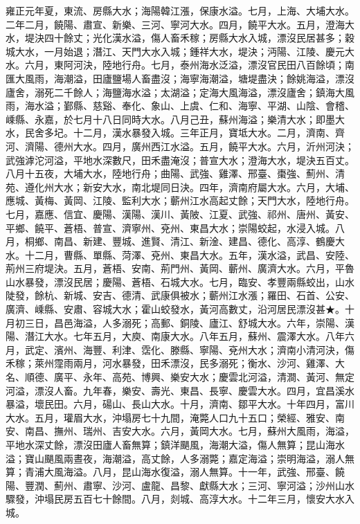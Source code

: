 \begin{pinyinscope}
雍正元年夏，東流、房縣大水；海陽韓江漲，保康水溢。七月，上海、大埔大水。二年二月，饒陽、肅宣、新樂、三河、寧河大水。四月，饒平大水。五月，澄海大水，堤決四十餘丈；光化漢水溢，傷人畜禾稼；房縣大水入城，漂沒民居甚多；穀城大水，一月始退；潛江、天門大水入城；鍾祥大水，堤決；沔陽、江陵、慶元大水。六月，東阿河決，陸地行舟。七月，泰州海水泛溢，漂沒官民田八百餘頃；南匯大風雨，海潮溢，田廬鹽場人畜盡沒；海寧海潮溢，塘堤盡決；餘姚海溢，漂沒廬舍，溺死二千餘人；海鹽海水溢；太湖溢；定海大風海溢，漂沒廬舍；鎮海大風雨，海水溢；鄞縣、慈谿、奉化、象山、上虞、仁和、海寧、平湖、山陰、會稽、嵊縣、永嘉，於七月十八日同時大水。八月己丑，蘇州海溢；樂清大水；即墨大水，民舍多圮。十二月，漢水暴發入城。三年正月，寶坻大水。二月，濟南、齊河、濟陽、德州大水。四月，廣州西江水溢。五月，饒平大水。六月，沂州河決；武強滹沱河溢，平地水深數尺，田禾盡淹沒；普宣大水；澄海大水，堤決五百丈。八月十五夜，大埔大水，陸地行舟；曲陽、武強、雞澤、邢臺、棗強、薊州、清苑、遵化州大水；新安大水，南北堤同日決。四年，濟南府屬大水。六月，大埔、應城、黃梅、黃岡、江陵、監利大水；蘄州江水高起丈餘；天門大水，陸地行舟。七月，嘉應、信宜、慶陽、漢陽、漢川、黃陂、江夏、武強、祁州、唐州、黃安、平鄉、饒平、蒼梧、普宣、濟寧州、兗州、東昌大水；崇陽蛟起，水浸入城。八月，桐鄉、南昌、新建、豐城、進賢、清江、新淦、建昌、德化、高淳、鶴慶大水。十二月，曹縣、單縣、菏澤、兗州、東昌大水。五年，漢水溢，武昌、安陸、荊州三府堤決。五月，蒼梧、安南、荊門州、黃岡、蘄州、廣濟大水。六月，平魯山水暴發，漂沒民居；慶陽、蒼梧、石城大水。七月，臨安、孝豐兩縣蛟出，山水陡發，餘杭、新城、安吉、德清、武康俱被水；蘄州江水漲；羅田、石首、公安、廣濟、嵊縣、安肅、容城大水；霍山蛟發水，黃河高數丈，沿河居民漂沒甚★。十月初三日，昌邑海溢，人多溺死；高郵、銅陵、廬江、舒城大水。六年，崇陽、漢陽、潛江大水。七年五月，大庾、南康大水。八年五月，蘇州、震澤大水。八年六月，武定、濱州、海豐、利津、霑化、滕縣、寧陽、兗州大水；濟南小清河決，傷禾稼；萊州霪雨兩月，河水暴發，田禾漂沒，民多溺死；衡水、沙河、雞澤、大名、順德、廣平、永年、高苑、博興、樂安大水；慶雲北河溢，清澗、黃河、無定河溢，漂沒人畜。九年春，樂安、壽光、東昌、長寧、慶雲大水。四月，宜昌溪水暴溢，壞民田。六月，碭山、長山大水。十月，濟南、鄒平大水。十年四月，富川大水。五月，瓘眉大水，沖塌房七十九間，淹斃人口九十五口；榮經、雅安、南安、南昌、撫州、瑞州、吉安大水。六月，黃岡大水。七月，蘇州大風雨，海溢，平地水深丈餘，漂沒田廬人畜無算；鎮洋颶風，海潮大溢，傷人無算；昆山海水溢；寶山颶風兩晝夜，海潮溢，高丈餘，人多溺斃；嘉定海溢；崇明海溢，溺人無算；青浦大風海溢。八月，昆山海水復溢，溺人無算。十一年，武強、邢臺、饒陽、豐潤、薊州、肅寧、沙河、盧龍、昌黎、獻縣大水；三河、寧河溢；沙州山水驟發，沖塌民房五百七十餘間。八月，剡城、高淳大水。十二年三月，懷安大水入城。


\end{pinyinscope}
